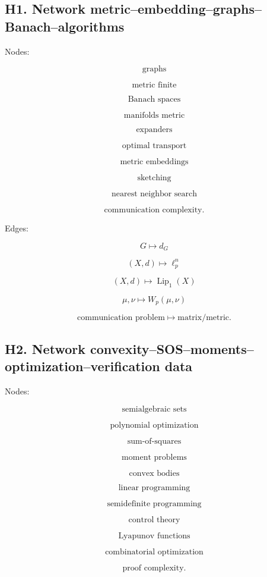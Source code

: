 \documentclass[11pt]{article}
\begin{document}
\subsection{H1. Network metric--embedding--graphs--Banach--algorithms}

Nodes:

\[
\text{graphs}
\]

\[
\text{metric finite}
\]

\[
\text{Banach spaces}
\]

\[
\text{manifolds metric}
\]

\[
\text{expanders}
\]

\[
\text{optimal transport}
\]

\[
\text{metric embeddings}
\]

\[
\text{sketching}
\]

\[
\text{nearest neighbor search}
\]

\[
\text{communication complexity}.
\]

Edges:

\[
G\mapsto d_G
\]

\[
(X,d)\mapsto \ell_p^n
\]

\[
(X,d)\mapsto \operatorname{Lip}_1(X)
\]

\[
\mu,\nu\mapsto W_p(\mu,\nu)
\]

\[
\text{communication problem}\mapsto \text{matrix/metric}.
\]



\subsection{H2. Network convexity--SOS--moments--optimization--verification data}

Nodes:

\[
\text{semialgebraic sets}
\]

\[
\text{polynomial optimization}
\]

\[
\text{sum-of-squares}
\]

\[
\text{moment problems}
\]

\[
\text{convex bodies}
\]

\[
\text{linear programming}
\]

\[
\text{semidefinite programming}
\]

\[
\text{control theory}
\]

\[
\text{Lyapunov functions}
\]

\[
\text{combinatorial optimization}
\]

\[
\text{proof complexity}.
\]
\end{document}
